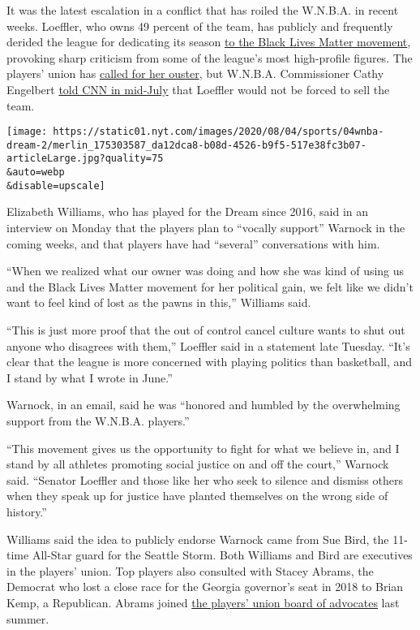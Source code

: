 It was the latest escalation in a conflict that has roiled the W.N.B.A.
in recent weeks. Loeffler, who owns 49 percent of the team, has publicly
and frequently derided the league for dedicating its season
\href{https://www.nytimes.com/2020/07/09/sports/basketball/kelly-loeffler-atlanta-dream-protests.html}{to
the Black Lives Matter movement}, provoking sharp criticism from some of
the league's most high-profile figures. The players' union has
\href{https://twitter.com/TheWNBPA?ref_src=twsrc\%5Egoogle\%7Ctwcamp\%5Eserp\%7Ctwgr\%5Eauthor}{called
for her ouster}, but W.N.B.A. Commissioner Cathy Engelbert
\href{https://www.youtube.com/watch?v=rVaI_-G8Nd0}{told CNN in mid-July}
that Loeffler would not be forced to sell the team.

\texttt{[image: https://static01.nyt.com/images/2020/08/04/sports/04wnba-dream-2/merlin\_175303587\_da12dca8-b08d-4526-b9f5-517e38fc3b07-articleLarge.jpg?quality=75\\\&auto=webp\\\&disable=upscale]}

Elizabeth Williams, who has played for the Dream since 2016, said in an
interview on Monday that the players plan to ``vocally support'' Warnock
in the coming weeks, and that players have had ``several'' conversations
with him.

``When we realized what our owner was doing and how she was kind of
using us and the Black Lives Matter movement for her political gain, we
felt like we didn't want to feel kind of lost as the pawns in this,''
Williams said.

``This is just more proof that the out of control cancel culture wants
to shut out anyone who disagrees with them,'' Loeffler said in a
statement late Tuesday. ``It's clear that the league is more concerned
with playing politics than basketball, and I stand by what I wrote in
June.''

Warnock, in an email, said he was ``honored and humbled by the
overwhelming support from the W.N.B.A. players.''

``This movement gives us the opportunity to fight for what we believe
in, and I stand by all athletes promoting social justice on and off the
court,'' Warnock said. ``Senator Loeffler and those like her who seek to
silence and dismiss others when they speak up for justice have planted
themselves on the wrong side of history.''

Williams said the idea to publicly endorse Warnock came from Sue Bird,
the 11-time All-Star guard for the Seattle Storm. Both Williams and Bird
are executives in the players' union. Top players also consulted with
Stacey Abrams, the Democrat who lost a close race for the Georgia
governor's seat in 2018 to Brian Kemp, a Republican. Abrams joined
\href{https://wnbpa.com/about/board/}{the players' union board of
advocates} last summer.

